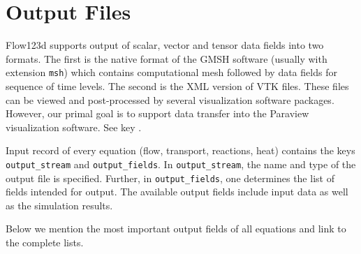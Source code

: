 %
%
%
%

\section{Output Files}
\label{section_output}

Flow123d supports output of scalar, vector and tensor data fields into two formats. The first is the native format of the GMSH software (usually with extension \verb'msh')
which contains computational mesh followed by data fields for sequence of time levels. The second is the XML version of VTK files. These files can be 
viewed and post-processed by several visualization software packages. However, our primal goal is to support data transfer into the Paraview visualization software.
See key .

Input record of every equation (flow, transport, reactions, heat) contains the keys {\tt output\_stream} and {\tt output\_fields}.
In {\tt output\_stream}, the name and type of the output file is specified.
Further, in {\tt output\_fields}, one determines the list of fields intended for output.
The available output fields include input data as well as the simulation results.

Below we mention the most important output fields of all equations and link to the complete lists.

